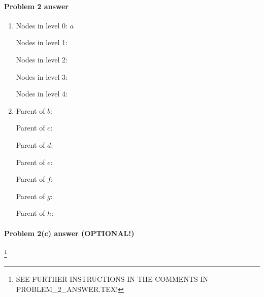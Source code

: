 \paragraph{Problem 2 answer}

\begin{enumerate}[label=(\alph*)]

\item  Nodes in level 0: $a$

  Nodes in level 1: \BLUE{$
    \REPLACEME
    $}

  Nodes in level 2: \BLUE{$
    \REPLACEME
    $}

  Nodes in level 3: \BLUE{$
    \REPLACEME
    $}

  Nodes in level 4: \BLUE{$
    \REPLACEME
    $}

\item

  Parent of $b$: \BLUE{$
    \REPLACEME
    $}

  Parent of $c$: \BLUE{$
    \REPLACEME
    $}

  Parent of $d$: \BLUE{$
    \REPLACEME
    $}

  Parent of $e$: \BLUE{$
    \REPLACEME
    $}

  Parent of $f$: \BLUE{$
    \REPLACEME
    $}

  Parent of $g$: \BLUE{$
    \REPLACEME
    $}

  Parent of $h$: \BLUE{$
    \REPLACEME
    $}
\end{enumerate}

\newpage

\paragraph{Problem 2(c) answer (OPTIONAL!)}\footnote
{\color{blue}
  SEE FURTHER INSTRUCTIONS IN THE COMMENTS IN PROBLEM\_2\_ANSWER.TEX!}


